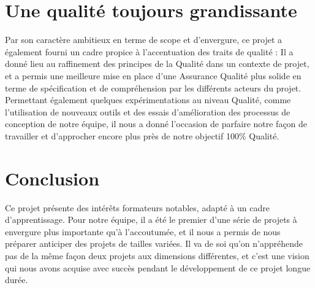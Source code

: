 \documentclass[a4paper]{article}
\begin{document}
\section{Une qualité toujours grandissante}

Par son caractère ambitieux en terme de scope et d'envergure, ce projet a également fourni un cadre propice à l'accentuation des traits de qualité : Il a donné lieu au raffinement des principes de la Qualité dans un contexte de projet, et a permis une meilleure mise en place d'une Assurance Qualité plus solide en terme de spécification et de compréhension par les différents acteurs du projet. Permettant également quelques expérimentations au niveau Qualité, comme l'utilisation de nouveaux outils et des essais d'amélioration des processus de conception de notre équipe, il nous a donné l'occasion de parfaire notre façon de travailler et d'approcher encore plus près de notre objectif 100\% Qualité.

\section{Conclusion}

Ce projet présente des intérêts formateurs notables, adapté à un cadre d'apprentissage. Pour notre équipe, il a été le premier d'une série de projets à envergure plus importante qu'à l'accoutumée, et il nous a permis de nous préparer anticiper des projets de tailles variées. Il va de soi qu'on n'appréhende pas de la même façon deux projets aux dimensions différentes, et c'est une vision qui nous avons acquise avec succès pendant le développement de ce projet longue durée.
\end{document}
